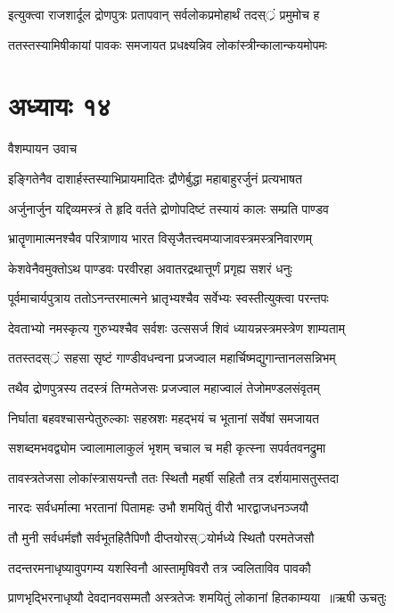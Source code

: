 \twolineshloka
{इत्युक्त्वा राजशार्दूल द्रोणपुत्रः प्रतापवान्}
{सर्वलोकप्रमोहार्थं तदस््रं प्रमुमोच ह}


\twolineshloka
{ततस्तस्यामिषीकायां पावकः समजायत}
{प्रधक्ष्यन्निव लोकांस्त्रीन्कालान्कयमोपमः}


\chapter{अध्यायः १४}
\twolineshloka
{वैशम्पायन उवाच}
{}


\twolineshloka
{इङ्गितेनैव दाशार्हस्तस्याभिप्रायमादितः}
{द्रौणेर्बुद्धा महाबाहुरर्जुनं प्रत्यभाषत}


\twolineshloka
{अर्जुनार्जुन यद्दिव्यमस्त्रं ते हृदि वर्तते}
{द्रोणोपदिष्टं तस्यायं कालः सम्प्रति पाण्डव}


\twolineshloka
{भ्रातॄणामात्मनश्चैव परित्राणाय भारत}
{विसृजैतत्त्वमप्याजावस्त्रमस्त्रनिवारणम्}


\twolineshloka
{केशवेनैवमुक्तोऽथ पाण्डवः परवीरहा}
{अवातरद्रथात्तूर्णं प्रगृह्य सशरं धनुः}


\twolineshloka
{पूर्वमाचार्यपुत्राय ततोऽनन्तरमात्मने}
{भ्रातृभ्यश्चैव सर्वेभ्यः स्वस्तीत्युक्त्वा परन्तपः}


\twolineshloka
{देवताभ्यो नमस्कृत्य गुरुभ्यश्चैव सर्वशः}
{उत्ससर्ज शिवं ध्यायन्नस्त्रमस्त्रेण शाम्यताम्}


\twolineshloka
{ततस्तदस््रं सहसा सृष्टं गाण्डीवधन्वना}
{प्रजज्वाल महार्चिष्मद्युगान्तानलसन्निभम्}


\twolineshloka
{तथैव द्रोणपुत्रस्य तदस्त्रं तिग्मतेजसः}
{प्रजज्वाल महाज्वालं तेजोमण्डलसंवृतम्}


\twolineshloka
{निर्घाता बहवश्चासन्पेतुरुल्काः सहस्रशः}
{महद्भयं च भूतानां सर्वेषां समजायत}


\twolineshloka
{सशब्दमभवद्व्योम ज्वालामालाकुलं भृशम्}
{चचाल च मही कृत्स्ना सपर्वतवनद्रुमा}


\twolineshloka
{तावस्त्रतेजसा लोकांस्त्रासयन्तौ ततः स्थितौ}
{महर्षी सहितौ तत्र दर्शयामासतुस्तदा}


\twolineshloka
{नारदः सर्वधर्मात्मा भरतानां पितामहः}
{उभौ शमयितुं वीरौ भारद्वाजधनञ्जयौ}


\twolineshloka
{तौ मुनी सर्वधर्मज्ञौ सर्वभूतहितैपिणौ}
{दीप्तयोरस््रयोर्मध्ये स्थितौ परमतेजसौ}


\twolineshloka
{तदन्तरमनाधृष्यावुपगम्य यशस्विनौ}
{आस्तामृषिवरौ तत्र ज्वलिताविव पावकौ}


\threelineshloka
{प्राणभृद्भिरनाधृष्यौ देवदानवसम्मतौ}
{अस्त्रतेजः शमयितुं लोकानां हितकाम्यया ॥ऋषी ऊचतुः}
{}


